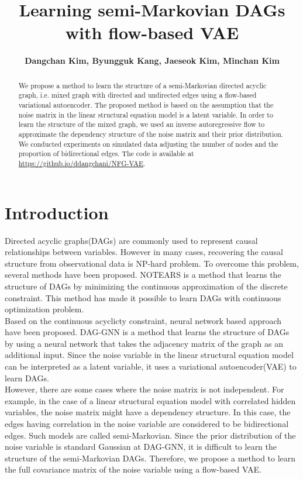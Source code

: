 \documentclass[10pt]{article}
\title{
\textbf{Learning semi-Markovian DAGs with flow-based VAE}}
\author{\normalsize\bfseries Dangchan Kim, Byungguk Kang, Jaeseok Kim, Minchan Kim}
\begin{document}
\maketitle

\begin{abstract}
    We propose a method to learn the structure of a semi-Markovian directed acyclic graph, i.e. mixed graph with directed and undirected edges using a flow-based variational autoencoder. The proposed method is based on the assumption that the noise matrix in the linear structural equation model is a latent variable. In order to learn the structure of the mixed graph, we used an inverse autoregressive flow to approximate the dependency structure of the noise matrix and their prior distribution. We conducted experiments on simulated data adjusting the number of nodes and the proportion of bidirectional edges. The code is available at \url{https://github.io/ddangchani/NFG-VAE}.
\end{abstract}

\section{Introduction}

Directed acyclic graphs(DAGs) are commonly used to represent causal relationships between variables. However in many cases, recovering the causal structure from observational data is NP-hard problem. \cite{ChickeringNPhard} To overcome this problem, several methods have been proposed. NOTEARS \cite{zheng2018dags} is a method that learns the structure of DAGs by minimizing the continuous approximation of the discrete constraint. This method has made it possible to learn DAGs with continuous optimization problem. \\

Based on the continuous acyclicty constraint, neural network based approach have been proposed. DAG-GNN \cite{yu2019daggnn} is a method that learns the structure of DAGs by using a neural network that takes the adjacency matrix of the graph as an additional input. Since the noise variable in the linear structural equation model can be interpreted as a latent variable, it uses a variational autoencoder(VAE) to learn DAGs.\\

However, there are some cases where the noise matrix is not independent. For example, in the case of a linear structural equation model with correlated hidden variables, the noise matrix might have a dependency structure. In this case, the edges having correlation in the noise variable are considered to be bidirectional edges. Such models are called semi-Markovian. \cite{Shipster2006semimarkovian} Since the prior distribution of the noise variable is standard Gaussian at DAG-GNN, it is difficult to learn the structure of the semi-Markovian DAGs. Therefore, we propose a method to learn the full covariance matrix of the noise variable using a flow-based VAE.\\
\end{document}
